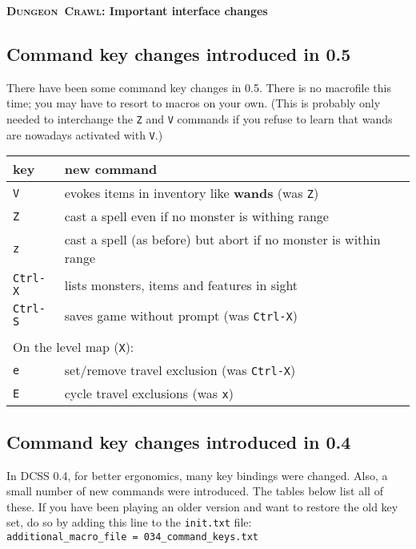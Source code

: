 \documentclass[a4paper,10pt]{article}
\newcommand{\key}[1]{{\texttt{#1}}} %
\newcommand{\crawl}{\textsc{Crawl}}
\newcommand{\dungeon}{\textsc{Dungeon}}
\begin{document}
\begin{center}\textbf{\LARGE
\dungeon\ \crawl: Important interface changes
}\end{center}

\subsection*{Command key changes introduced in 0.5}

There have been some command key changes in 0.5. There is no macrofile this time; you may have to resort to macros on your own. 
(This is probably only needed to interchange the \key{Z} and \key{V} commands if you refuse to learn that wands are nowadays
activated with \key{V}.)

\begin{center}
\begin{tabular}{ll}
key          & new command \\ \hline
\key{V}      & evokes items in inventory like \textbf{wands} (was \key{Z}) \\
\key{Z}      & cast a spell even if no monster is withing range \\
\key{z}      & cast a spell (as before) but abort if no monster is within range \\
\key{Ctrl-X} & lists monsters, items and features in sight \\
\key{Ctrl-S} & saves game without prompt (was \key{Ctrl-X}) \\
\\
\multicolumn{2}{l}{On the level map (\key{X}):} \\
\key{e}      & set/remove travel exclusion (was \key{Ctrl-X}) \\
\key{E}      & cycle travel exclusions (was \key{x})
\end{tabular}
\end{center}

\newpage

\subsection*{Command key changes introduced in 0.4}

In DCSS 0.4, for better ergonomics, many key bindings were changed. Also,
a small number of new commands were introduced. The tables below list all 
of these. If you have been playing an older version and want to restore 
the old key set, do so by adding this line to the 
\texttt{init.txt} file: \\
\verb$additional_macro_file = 034_command_keys.txt$ 
\end{document}
